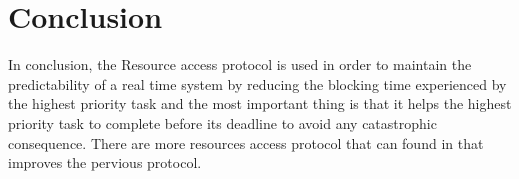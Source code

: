 \section{Conclusion}

In conclusion, the Resource access protocol is used in order to maintain the predictability of a real time system by reducing the blocking time experienced by the highest priority task and the most important thing is that it helps the highest priority task to complete before its deadline to avoid any catastrophic consequence. There are more resources access protocol that can found in \cite{b5} that improves the pervious protocol.